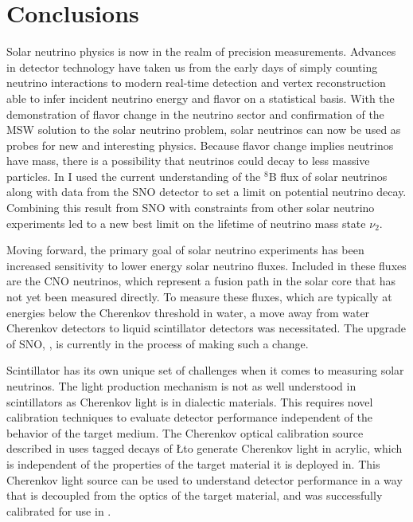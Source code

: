 \chapter{Conclusions}

Solar neutrino physics is now in the realm of precision measurements.
Advances in detector technology have taken us from the early days of simply counting neutrino interactions to modern real-time detection and vertex reconstruction able to infer incident neutrino energy and flavor on a statistical basis.
With the demonstration of flavor change in the neutrino sector and confirmation of the MSW solution to the solar neutrino problem, solar neutrinos can now be used as probes for new and interesting physics.
Because flavor change implies neutrinos have mass, there is a possibility that neutrinos could decay to less massive particles.
In  I used the current understanding of the $^8$B flux of solar neutrinos along with data from the SNO detector to set a limit on potential neutrino decay.
Combining this result from SNO with constraints from other solar neutrino experiments led to a new best limit on the lifetime of neutrino mass state $\nu_2$.

Moving forward, the primary goal of solar neutrino experiments has been increased sensitivity to lower energy solar neutrino fluxes.
Included in these fluxes are the CNO neutrinos, which represent a fusion path in the solar core that has not yet been measured directly.
To measure these fluxes, which are typically at energies below the Cherenkov threshold in water, a move away from water Cherenkov detectors to liquid scintillator detectors was necessitated.
The upgrade of SNO, {\snop}, is currently in the process of making such a change.

Scintillator has its own unique set of challenges when it comes to measuring solar neutrinos.
The light production mechanism is not as well understood in scintillators as Cherenkov light is in dialectic materials.
This requires novel calibration techniques to evaluate detector performance independent of the behavior of the target medium.
The Cherenkov optical calibration source described in  uses tagged decays of \L to generate Cherenkov light in acrylic, which is independent of the properties of the target material it is deployed in.
This Cherenkov light source can be used to understand detector performance in a way that is decoupled from the optics of the target material, and was successfully calibrated for use in {\snop}.

